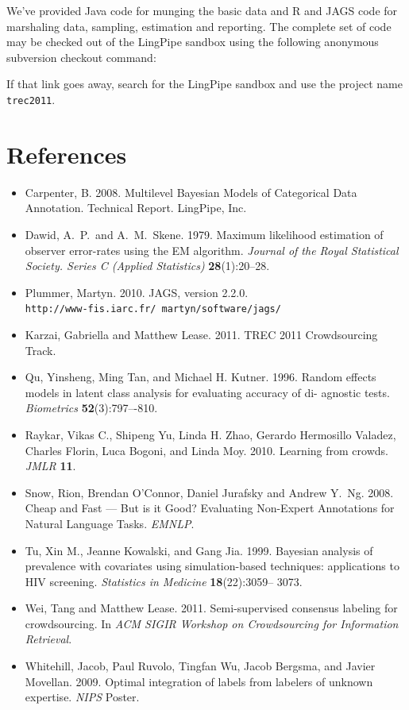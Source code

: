 \documentclass{article}
\begin{document}
We've provided Java code for munging the basic data and R and JAGS
code for marshaling data, sampling, estimation and reporting.  The
complete set of code may be checked out of the LingPipe sandbox
using the following anonymous subversion checkout command:

If that link goes away, search for the LingPipe sandbox and use
the project name {\tt trec2011}.

\section*{References}

\begin{itemize}
%
\item Carpenter, B. 2008. Multilevel Bayesian Models of
Categorical Data Annotation.  Technical Report.  LingPipe, Inc.
%
\item Dawid, A.~P.\ and A.~M.~Skene. 1979.  Maximum likelihood
estimation of observer error-rates using the EM algorithm.  {\it
Journal of the Royal Statistical Society. Series C (Applied
Statistics)} {\bf 28}(1):20--28.
%
\item Plummer, Martyn. 2010.  JAGS, version 2.2.0. 
\\ {\tt http://www-fis.iarc.fr/~martyn/software/jags/}
%
\item Karzai, Gabriella and Matthew Lease. 2011.  TREC 2011
Crowdsourcing Track.
%
\item
Qu, Yinsheng, Ming Tan, and Michael H. Kutner. 1996. Random effects
models in latent class analysis for evaluating accuracy of di-
agnostic tests. {\it Biometrics} {\bf 52}(3):797–-810.
%
\item
Raykar, Vikas C., Shipeng Yu, Linda H. Zhao, Gerardo Hermosillo
Valadez, Charles Florin, Luca Bogoni, 
and Linda Moy.  2010. Learning from crowds. {\it JMLR} {\bf 11}.
%
\item Snow, Rion, Brendan O'Connor, Daniel Jurafsky and Andrew
Y.~Ng. 2008. 
Cheap and Fast --- But is it Good? Evaluating Non-Expert Annotations
for Natural Language Tasks. 
{\it EMNLP}.
%
\item 
Tu, Xin M., Jeanne Kowalski, and Gang Jia. 1999.
Bayesian analysis of prevalence with covariates using simulation-based
techniques: applications to HIV screening. 
{\it Statistics in Medicine} {\bf 18}(22):3059– 3073.
%
\item Wei, Tang and Matthew Lease. 2011.  Semi-supervised consensus
labeling for crowdsourcing. In {\it ACM SIGIR Workshop on Crowdsourcing for
Information Retrieval}.
%
\item Whitehill, Jacob, Paul Ruvolo, Tingfan Wu, Jacob Bergsma, and
Javier Movellan. 2009. Optimal integration of labels from labelers of
unknown expertise. {\it NIPS} Poster. 
%
\end{itemize}
\end{document}
